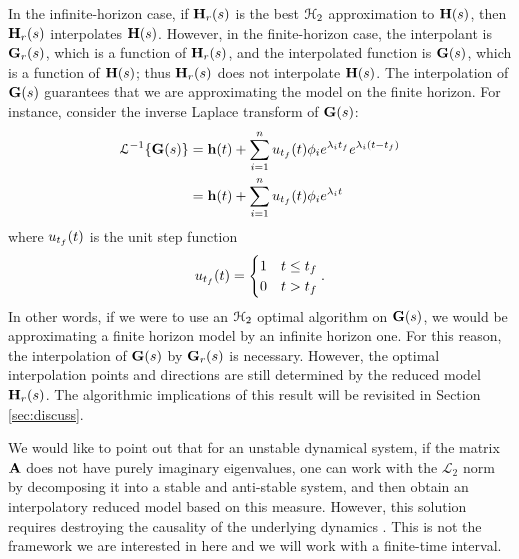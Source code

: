 \documentclass[twocolumn]{autart}
\begin{document}
\begin{remark}
{\color{red} In the infinite-horizon case, if  $\mathbf{H}_r(s)$ is the best $\EuScript{H}_2$ approximation to $\mathbf{H}(s)$, then $\mathbf{H}_r(s)$ interpolates $\mathbf{H}(s)$. However, in the finite-horizon case, 
the interpolant is $\mathbf{G}_r(s)$, which is a function of $\mathbf{H}_r(s)$, and the interpolated function is $\mathbf{G}(s)$, which is a function of $\mathbf{H}(s)$; thus $\mathbf{H}_r(s)$ does not interpolate $\mathbf{H}(s)$. The interpolation of $\mathbf{G}(s)$ guarantees that we are approximating the model on the finite horizon. For instance, consider the inverse Laplace transform of $\mathbf{G}(s)$:
\begin{align*}
\EuScript{L}^{-1}\{\mathbf{G}(s)\}&=\mathbf{h}(t)+\sum_{i=1}^n u_{t_f}(t)\phi_i e^{\lambda_i {t_f}}e^{\lambda_i (t-{t_f})}\\
&=\mathbf{h}(t)+\sum_{i=1}^n u_{t_f}(t)\phi_i e^{\lambda_i t}
\end{align*}
where $u_{t_f}(t)$ is the unit step function
\begin{align*}
u_{t_f}(t)=
 \begin{cases} 
      1 &    t\leq {t_f} \\    
      0 &    t > {t_f} 
   \end{cases}.
\end{align*}
In other words, if we were to use an $\EuScript{H}_2$ optimal algorithm on $\mathbf{G}(s)$, we would be approximating a finite horizon model by an infinite horizon one. For this reason, the interpolation of $\mathbf{G}(s)$ by $\mathbf{G}_r(s)$ is necessary. 
However, the optimal interpolation points  and directions are still determined by the reduced model $\mathbf{H}_r(s)$. The algorithmic implications of this result will be revisited in Section \ref{sec:discuss}.}
\end{remark}

\begin{remark}
{\color {red}
We would like to point out that for an unstable dynamical system, if the matrix $\mathbf{A}$ does not have purely imaginary eigenvalues, one can work with the
 $\mathcal{L}_2$ norm by decomposing it into a stable and anti-stable system, and then obtain an interpolatory reduced model based on this measure.  However, this solution requires destroying the causality of the underlying dynamics \cite{magruder2010rational}. This is not the framework we are interested in here and we will work with a finite-time interval. }
 \end{remark}
\end{document}
